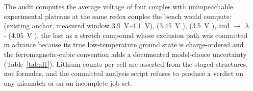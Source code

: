 \documentclass[reprint,aps,prb,amsmath,amssymb,nofootinbib,longbibliography]{revtex4-2}
\begin{document}
The audit computes the average voltage of four couples with unimpeachable
experimental plateaus at the same redox couples the bench would compute:
 (existing anchor, measured window
\SIrange{3.9}{4.1}{\volt}), 
(\SI{3.45}{\volt} \cite{padhi1997}), 
(\SI{3.5}{\volt} \cite{nishimura2010}), and  $\to$
$\lambda$-
(\SI{4.05}{\volt} \cite{thackeray1983,ohzuku1990}), the last as a stretch
compound whose exclusion path was committed in advance because its true low-temperature
ground state is charge-ordered \cite{rodriguez1998} and the
ferromagnetic-cubic convention adds a documented model-choice uncertainty
(Table~\ref{tab:d1}). Lithium counts per cell are asserted from the staged
structures, not formulas, and the committed analysis script refuses to
produce a verdict on any mismatch or on an incomplete job set.
\end{document}

